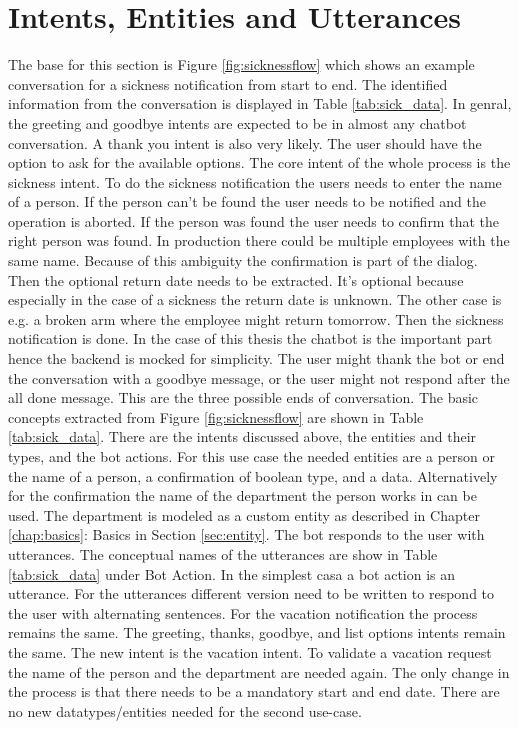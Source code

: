  
 
 \section{Intents, Entities and Utterances}
 The base for this section is Figure \ref{fig:sicknessflow} which shows an example conversation 
 for a sickness notification from start to end.
 The identified information from the conversation is displayed in Table \ref{tab:sick_data}.
 In genral, the greeting and goodbye intents are expected to be in almost any chatbot conversation.
 A thank you intent is also very likely.
 The user should have the option to ask for the available options.
 The core intent of the whole process is the sickness intent.
 To do the sickness notification the users needs to enter the name of a person.
 If the person can't be found the user needs to be notified and the operation is aborted.
 If the person was found the user needs to confirm that the right person was found.
 In production there could be multiple employees with the same name. 
 Because of this ambiguity the confirmation is part of the dialog.
 Then the optional return date needs to be extracted.
 It's optional because especially in the case of a sickness the return date is unknown.
 The other case is e.g. a broken arm where the employee might return tomorrow.
 Then the sickness notification is done.
 In the case of this thesis the chatbot is the important part hence the backend is mocked for simplicity.
 The user might thank the bot or end the conversation with a goodbye message, or the user might not respond after the all done message.
 This are the three possible ends of conversation.
 The basic concepts extracted from Figure \ref{fig:sicknessflow} are shown in Table \ref{tab:sick_data}.
 There are the intents discussed above, the entities and their types, and the bot actions.
 For this use case the needed entities are a person or the name of a person, a confirmation of boolean type, and a data.
 Alternatively for the confirmation the name of the department the person works in can be used.
 The department is modeled as a custom entity as described in Chapter \ref{chap:basics}: Basics in Section \ref{sec:entity}.
 The bot responds to the user with utterances.
 The conceptual names of the utterances are show in Table \ref{tab:sick_data} under Bot Action.
 In the simplest casa a bot action is an utterance.
 For the utterances different version need to be written to respond to the user with alternating sentences.
 For the vacation notification the process remains the same.
 The greeting, thanks, goodbye, and list options intents remain the same.
 The new intent is the vacation intent.
 To validate a vacation request the name of the person and the department are needed again.
 The only change in the process is that there needs to be a mandatory start and end date.
 There are no new datatypes/entities needed for the second use-case.


